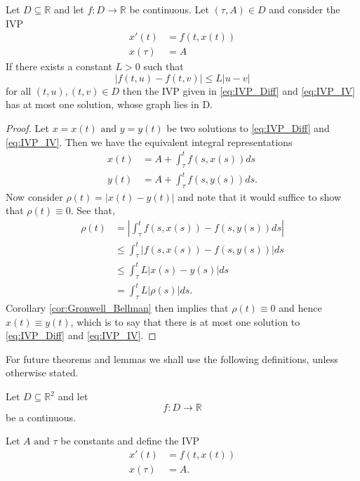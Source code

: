 \documentclass{unswmaths}
\begin{document}
\begin{unswlem}
\label{lem:Non_Multiplicity}
Let $ D \subseteq \mathbb{R} $ and let $ f : D \longrightarrow \mathbb{R} $ be continuous.
Let $ (\tau, A) \in D $ and consider the IVP
\begin{align}
	\label{eq:IVP_Diff}
	x'(t) &= f(t,x(t)) \\
	\label{eq:IVP_IV}
	x(\tau) &= A
\end{align}
If there exists a constant $ L > 0 $ such that 
$$
	|f(t,u) - f(t,v)| \leq L|u-v| 
$$
for all $ (t,u),(t,v) \in D $ then the IVP given in \eqref{eq:IVP_Diff} and \eqref{eq:IVP_IV}
has at most one solution, whose graph lies in D.
\end{unswlem}
\begin{proof}
Let  $ x = x(t) \text{ and } y = y(t) $ be two solutions to \eqref{eq:IVP_Diff} and 
\eqref{eq:IVP_IV}.
Then we have the equivalent integral representations
\begin{align*}
x(t) 	&= A + \int_\tau^t f(s,x(s))ds \\
y(t)	&= A + \int_\tau^t f(s,y(s))ds.
\end{align*}
Now consider $ \rho(t) = |x(t) - y(t)| $ and note that it would suffice to show that
$ \rho(t) \equiv 0 $. 
See that,
\begin{align*}
\rho(t) 	&= |\int_\tau^t f(s,x(s)) - f(s,y(s))ds| \\
		&\leq \int_\tau^t|f(s,x(s))-f(s,y(s))|ds \\
		&\leq \int_\tau^t L|x(s)-y(s)| ds \\
		&= \int_\tau^t L|\rho(s)|ds.
\end{align*}
Corollary \ref{cor:Gronwell_Bellman} then implies that  $ \rho(t) \equiv 0 $ 
and hence $ x(t) \equiv y(t) $, which is to say that there is at most one solution to
\eqref{eq:IVP_Diff} and \eqref{eq:IVP_IV}.
\end{proof}

For future theorems and lemmas we shall use the following definitions, unless otherwise 
stated.

Let $ D \subseteq \mathbb{R}^2 $ and let 
\begin{equation}
	\label{def:IVP_Gen_Fun}
	f : D \longrightarrow \mathbb{R}
\end{equation}
be a continuous. 

Let $ A \text{ and } \tau $ be constants and define the IVP
\begin{align}
	\label{def:IVP_Diff}
	x'(t)	&= f(t,x(t)) \\
	\label{def:IVP_IV}
	x(\tau) &= A.
\end{align}
\end{document}
